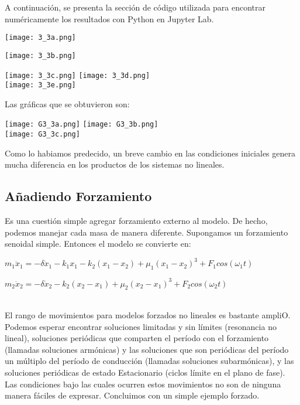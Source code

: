 \documentclass[12pt]{article}
\begin{document}
A continuación, se presenta la sección de código utilizada para encontrar numéricamente los resultados con Python en Jupyter Lab.
\begin{center}
    \texttt{[image: 3\_3a.png]}\\
\end{center}
\begin{center}
    \texttt{[image: 3\_3b.png]}
\end{center}
\begin{center}
    \texttt{[image: 3\_3c.png]}\hspace*{\fill}
    \texttt{[image: 3\_3d.png]}\\
     \texttt{[image: 3\_3e.png]}
\end{center}
Las gráficas que se obtuvieron son:
\begin{center}
    \texttt{[image: G3\_3a.png]}\hspace*{\fill}
    \texttt{[image: G3\_3b.png]}\\
     \texttt{[image: G3\_3c.png]}
\end{center}
Como lo habiamos predecido, un breve cambio en las condiciones iniciales genera mucha diferencia en los productos de los sistemas no lineales.

\subsection*{Añadiendo Forzamiento}
Es una cuestión simple agregar forzamiento externo al modelo. De hecho, podemos manejar cada masa de manera diferente. Supongamos un forzamiento senoidal simple. Entonces el modelo se convierte en:\\
\centerline{$m_1 \ddot x_1 = -\delta \dot x_1 -k_1x_1 - k_2(x_1-x_2) + \mu_1 (x_1-x_2)^3 + F_1 cos(\omega_1 t)$}
\centerline{$m_2 \ddot x_2 = -\delta \dot x_2 -k_2(x_2-x_1) + \mu_2 (x_2-x_1)^3 + F_2 cos(\omega_2 t)$}\\

El rango de movimientos para modelos forzados no lineales es bastante ampliO. Podemos esperar encontrar soluciones limitadas y sin límites (resonancia no lineal), soluciones periódicas que comparten el período con el forzamiento (llamadas soluciones armónicas) y las soluciones que son periódicas del período un múltiplo del período de conducción (llamadas soluciones subarmónicas), y las soluciones periódicas de estado Estacionario (ciclos límite en el plano de fase). Las condiciones bajo las cuales ocurren estos movimientos no son de ninguna manera fáciles de expresar. Concluimos con un simple ejemplo forzado.\\ 
\end{document}
